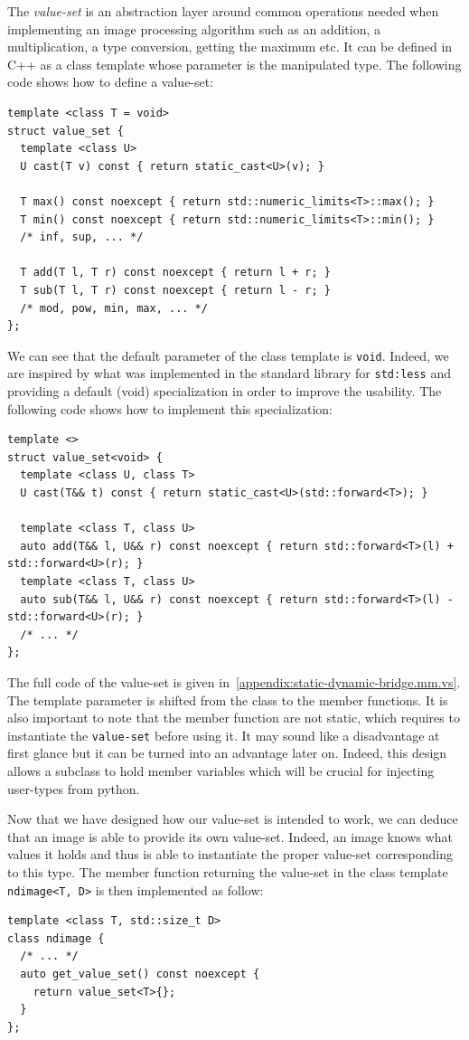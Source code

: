 The \emph{value-set} is an abstraction layer around common operations needed when implementing an image processing
algorithm such as an addition, a multiplication, a type conversion, getting the maximum etc. It can be defined in C++ as
a class template whose parameter is the manipulated type. The following code shows how to define a value-set:
\begin{verbatim}
template <class T = void>
struct value_set {
  template <class U>
  U cast(T v) const { return static_cast<U>(v); }

  T max() const noexcept { return std::numeric_limits<T>::max(); }
  T min() const noexcept { return std::numeric_limits<T>::min(); }
  /* inf, sup, ... */

  T add(T l, T r) const noexcept { return l + r; }
  T sub(T l, T r) const noexcept { return l - r; }
  /* mod, pow, min, max, ... */
};
\end{verbatim}
We can see that the default parameter of the class template is \texttt{void}. Indeed, we are inspired by what was
implemented in the standard library for \texttt{std:less} and providing a default (void) specialization in order to
improve the usability. The following code shows how to implement this specialization:
\begin{verbatim}
template <>
struct value_set<void> {
  template <class U, class T>
  U cast(T&& t) const { return static_cast<U>(std::forward<T>); }

  template <class T, class U>
  auto add(T&& l, U&& r) const noexcept { return std::forward<T>(l) + std::forward<U>(r); }
  template <class T, class U>
  auto sub(T&& l, U&& r) const noexcept { return std::forward<T>(l) - std::forward<U>(r); }
  /* ... */
};
\end{verbatim}
The full code of the value-set is given in~\cref{appendix:static-dynamic-bridge.mm.vs}. The template parameter is
shifted from the class to the member functions. It is also important to note that the member function are not static,
which requires to instantiate the \texttt{value-set} before using it. It may sound like a disadvantage at first glance
but it can be turned into an advantage later on. Indeed, this design allows a subclass to hold member variables which
will be crucial for injecting user-types from python.

Now that we have designed how our value-set is intended to work, we can deduce that an image is able to provide its own
value-set. Indeed, an image knows what values it holds and thus is able to instantiate the proper value-set
corresponding to this type. The member function returning the value-set in the class template \texttt{ndimage<T, D>} is
then implemented as follow:
\begin{verbatim}
template <class T, std::size_t D>
class ndimage {
  /* ... */
  auto get_value_set() const noexcept {
    return value_set<T>{};
  }
};
\end{verbatim}


